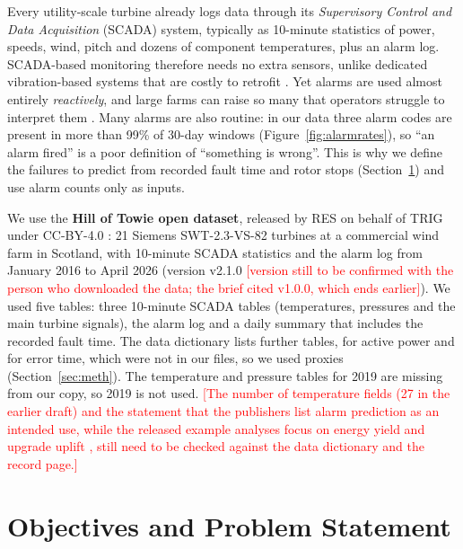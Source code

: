 \documentclass[12pt,a4paper]{article}
\newcommand{\tbc}[1]{\textcolor{red}{[#1]}}
\begin{document}
	Every utility-scale turbine already logs data through its \emph{Supervisory Control and Data Acquisition} (SCADA) system, typically as 10-minute statistics of power, speeds, wind, pitch and dozens of component temperatures, plus an alarm log. SCADA-based monitoring therefore needs no extra sensors, unlike dedicated vibration-based systems that are costly to retrofit \cite{tautzweinert2017}. Yet alarms are used almost entirely \emph{reactively}, and large farms can raise so many that operators struggle to interpret them \cite{qiu2012}. Many alarms are also routine: in our data three alarm codes are present in more than 99\% of 30-day windows (Figure~\ref{fig:alarmrates}), so ``an alarm fired'' is a poor definition of ``something is wrong''. This is why we define the failures to predict from recorded fault time and rotor stops (Section~\ref{sec:prob}) and use alarm counts only as inputs.

	We use the \textbf{Hill of Towie open dataset}, released by RES on behalf of TRIG under CC-BY-4.0 \cite{hot_dataset_v1,hot_dataset_v2}: 21 Siemens SWT-2.3-VS-82 turbines at a commercial wind farm in Scotland, with 10-minute SCADA statistics and the alarm log from January 2016 to April 2026 (version v2.1.0 \tbc{version still to be confirmed with the person who downloaded the data; the brief cited v1.0.0, which ends earlier}). We used five tables: three 10-minute SCADA tables (temperatures, pressures and the main turbine signals), the alarm log and a daily summary that includes the recorded fault time. The data dictionary lists further tables, for active power and for error time, which were not in our files, so we used proxies (Section~\ref{sec:meth}). The temperature and pressure tables for 2019 are missing from our copy, so 2019 is not used. \tbc{The number of temperature fields (27 in the earlier draft) and the statement that the publishers list alarm prediction as an intended use, while the released example analyses focus on energy yield and upgrade uplift \cite{res_repo}, still need to be checked against the data dictionary and the record page.}

	\section{Objectives and Problem Statement}\label{sec:prob}
\end{document}
